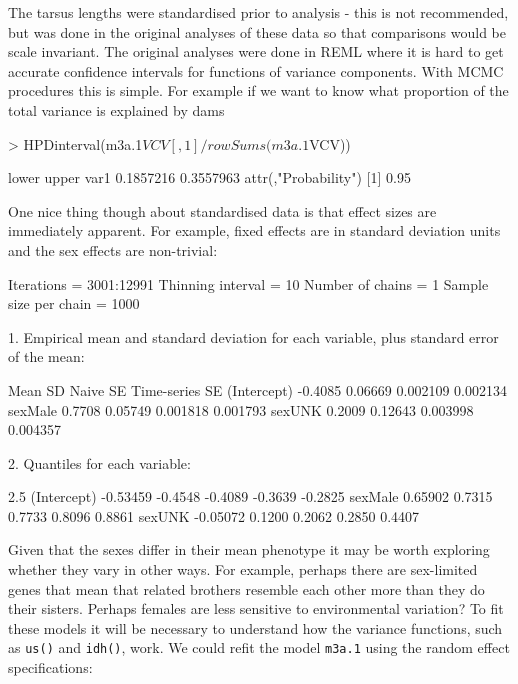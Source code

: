 \documentclass{article}
\begin{document}
The tarsus lengths were standardised prior to analysis - this is not recommended, but was done in the original analyses of these data \citep{Hadfield.2007} so that comparisons would be scale invariant. The original analyses were done in REML where it is hard to get accurate confidence intervals for functions of variance components.  With MCMC procedures this is simple. For example if we want to know what proportion of the total variance is explained by dams 

\begin{Schunk}
\begin{Sinput}
> HPDinterval(m3a.1$VCV[, 1]/rowSums(m3a.1$VCV))
\end{Sinput}
\begin{Soutput}
         lower     upper
var1 0.1857216 0.3557963
attr(,"Probability")
[1] 0.95
\end{Soutput}
\end{Schunk}

One nice thing though about standardised data is that effect sizes are immediately apparent. For example, fixed effects are in standard deviation units and the sex effects are non-trivial:

\begin{Schunk}
\begin{Soutput}
Iterations = 3001:12991
Thinning interval = 10 
Number of chains = 1 
Sample size per chain = 1000 

1. Empirical mean and standard deviation for each variable,
   plus standard error of the mean:

               Mean      SD Naive SE Time-series SE
(Intercept) -0.4085 0.06669 0.002109       0.002134
sexMale      0.7708 0.05749 0.001818       0.001793
sexUNK       0.2009 0.12643 0.003998       0.004357

2. Quantiles for each variable:

                2.5%
(Intercept) -0.53459 -0.4548 -0.4089 -0.3639 -0.2825
sexMale      0.65902  0.7315  0.7733  0.8096  0.8861
sexUNK      -0.05072  0.1200  0.2062  0.2850  0.4407
\end{Soutput}
\end{Schunk}

Given that the sexes differ in their mean phenotype it may be worth exploring whether they vary in other ways. For example, perhaps there are sex-limited genes that mean that related brothers resemble each other more than they do their sisters. Perhaps females are less sensitive to environmental variation? To fit these models it will be necessary to understand how the variance functions, such as \texttt{us()} and \texttt{idh()}, work.  We could refit the model \texttt{m3a.1} using the random effect specifications:
\end{document}
